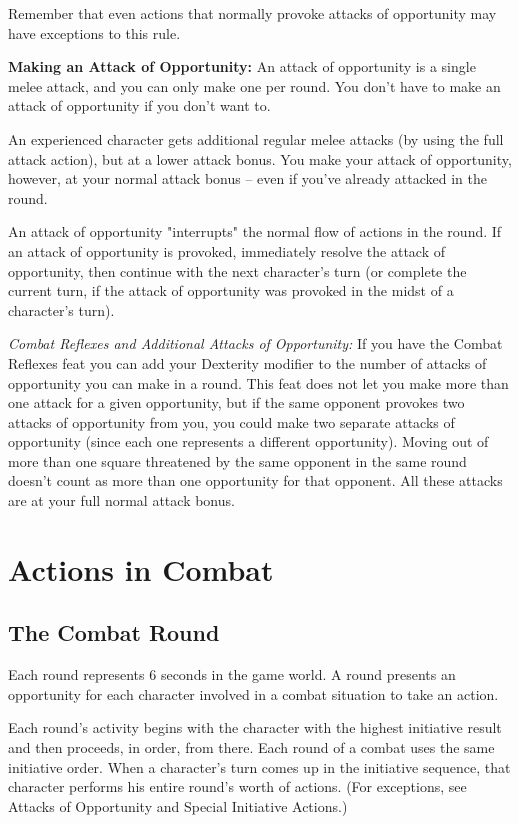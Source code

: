 Remember that even actions that normally provoke attacks of opportunity may have 
exceptions to this rule.

\textbf{Making an Attack of Opportunity:} An attack of opportunity is a single 
melee attack, and you can only make one per round. You don't have to make an attack 
of opportunity if you don't want to.

An experienced character gets additional regular melee attacks (by using the full 
attack action), but at a lower attack bonus. You make your attack of opportunity, 
however, at your normal attack bonus -- even if you've already attacked in the round.

An attack of opportunity "interrupts" the normal flow of actions in the round. 
If an attack of opportunity is provoked, immediately resolve the attack of opportunity, 
then continue with the next character's turn (or complete the current turn, if 
the attack of opportunity was provoked in the midst of a character's turn).

\textit{Combat Reflexes and Additional Attacks of Opportunity:} If you have the 
Combat Reflexes feat you can add your Dexterity modifier to the number of attacks 
of opportunity you can make in a round. This feat does not let you make more than 
one attack for a given opportunity, but if the same opponent provokes two attacks 
of opportunity from you, you could make two separate attacks of opportunity (since 
each one represents a different opportunity). Moving out of more than one square 
threatened by the same opponent in the same round doesn't count as more than one 
opportunity for that opponent. All these attacks are at your full normal attack 
bonus.

\section{Actions in Combat}

\subsection{The Combat Round}

Each round represents 6 seconds in the game world. A round presents an opportunity 
for each character involved in a combat situation to take an action. 

Each round's activity begins with the character with the highest initiative result 
and then proceeds, in order, from there. Each round of a combat uses the same initiative 
order. When a character's turn comes up in the initiative sequence, that character 
performs his entire round's worth of actions. (For exceptions, see Attacks of Opportunity 
and Special Initiative Actions.)

